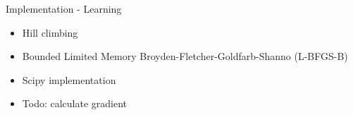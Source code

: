 \documentclass{beamer}
\newlength{\wideitemsep}
\let\olditem\item
\renewcommand{\item}{\setlength{\itemsep}{\wideitemsep}\olditem}
\begin{document}
\begin{frame}{Implementation - Learning}
  \begin{itemize}
  \item Hill climbing
  \item Bounded Limited Memory Broyden-Fletcher-Goldfarb-Shanno (L-BFGS-B)
  \item Scipy implementation 
  \item Todo: calculate gradient
  \end{itemize}
\end{frame}

\end{document}
